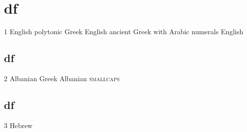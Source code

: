 \documentclass{article}
\begin{document}
\part{df}

1 English \textgreek[variant=polytonic]{polytonic Greek} English
\textgreek[numerals=arabic, variant=ancient]{ancient G\textsf{reek} with Arabic numerals} English

\begin{albanian}%

\part{df}

2 Albanian \textgreek{Greek} Albanian \textsc{smallcaps}

\end{albanian}%
\begin{hebrew}%

\part{df}

3 Hebrew

\end{hebrew}%

\begin{albanian}%
\end{albanian}%
\end{document}
